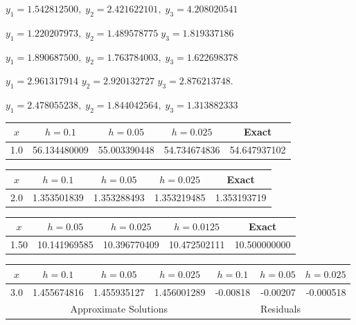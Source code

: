 \medskip

$y_{1}=1.542812500,\;y_{2}=2.421622101,\;y_{3}=4.208020541$

$y_{1}=1.220207973,\;y_{2}=1.489578775\;y_{3}=1.819337186$

$y_{1}=1.890687500,\;y_{2}=1.763784003,\;y_{3}=1.622698378$

$y_{1}=2.961317914$\; $y_{2}=2.920132727$\; $y_{3}=2.876213748$.

$y_{1}=2.478055238,\;y_{2}=1.844042564,\;y_{3}=1.313882333$

\bigskip
{}
{\small
\begin{tabular}{|c|r|r|r|r|}\hline
\multicolumn{1}{|c|}{$x$}&
\multicolumn{1}{|c|}{$h=0.1$}&
\multicolumn{1}{|c|}{$h=0.05$}&
\multicolumn{1}{|c|}{$h=0.025$}&
\multicolumn{1}{|c|}{Exact}\\ \hline
1.0 & 56.134480009 & 55.003390448 & 54.734674836 &  54.647937102 \\
\hline
\end{tabular}}

\bigskip
{}
{\small
\begin{tabular}{|c|r|r|r|r|}\hline
\multicolumn{1}{|c|}{$x$}&
\multicolumn{1}{|c|}{$h=0.1$}&
\multicolumn{1}{|c|}{$h=0.05$}&
\multicolumn{1}{|c|}{$h=0.025$}&
\multicolumn{1}{|c|}{Exact}\\ \hline
2.0 & 1.353501839 & 1.353288493 & 1.353219485 & 1.353193719\\
\hline
\end{tabular}}

\bigskip

{\small
\begin{tabular}{|c|r|r|r|r|}\hline
\multicolumn{1}{|c|}{$x$}&
\multicolumn{1}{|c|}{$h=0.05$}&
\multicolumn{1}{|c|}{$h=0.025$}&
\multicolumn{1}{|c|}{$h=0.0125$}&
\multicolumn{1}{|c|}{Exact}\\ \hline
1.50 &10.141969585  & 10.396770409 & 10.472502111 & 10.500000000 \\
\hline
\end{tabular}}

\bigskip

{\small
\begin{tabular}{|c|r|r|r|r|r|r|}\hline
\multicolumn{1}{|c|}{$x$}&
\multicolumn{1}{|c|}{$h=0.1$}&
\multicolumn{1}{|c|}{$h=0.05$}&
\multicolumn{1}{|c|}{$h=0.025$}&
\multicolumn{1}{|c|}{$h=0.1$}&
\multicolumn{1}{|c|}{$h=0.05$}&
\multicolumn{1}{|c|}{$h=0.025$}\\ \hline
3.0 & 1.455674816 & 1.455935127 &1.456001289  &-0.00818  & -0.00207 & -0.000518  \\
\hline
&\multicolumn{3}{c|}{Approximate Solutions}&
\multicolumn{3}{c|}{Residuals}\\\hline
\end{tabular}}

